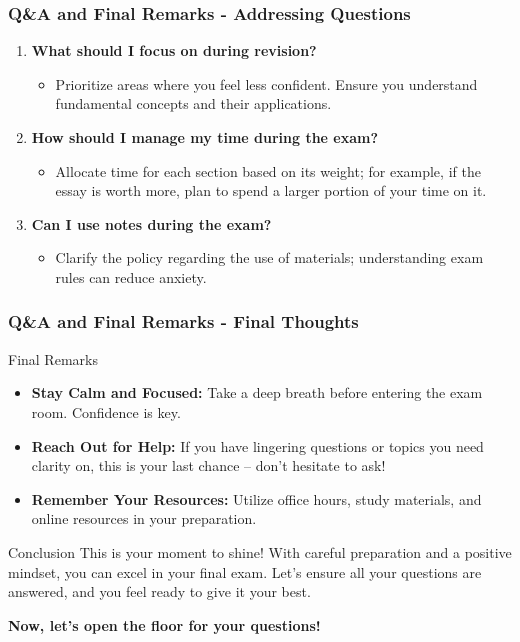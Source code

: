 \documentclass{beamer}
\begin{document}
\begin{frame}[fragile]
    \frametitle{Q\&A and Final Remarks - Addressing Questions}
    \begin{enumerate}
        \item \textbf{What should I focus on during revision?}
        \begin{itemize}
            \item Prioritize areas where you feel less confident. Ensure you understand fundamental concepts and their applications.
        \end{itemize}
        
        \item \textbf{How should I manage my time during the exam?}
        \begin{itemize}
            \item Allocate time for each section based on its weight; for example, if the essay is worth more, plan to spend a larger portion of your time on it.
        \end{itemize}
        
        \item \textbf{Can I use notes during the exam?}
        \begin{itemize}
            \item Clarify the policy regarding the use of materials; understanding exam rules can reduce anxiety.
        \end{itemize}
    \end{enumerate}
\end{frame}

\begin{frame}[fragile]
    \frametitle{Q\&A and Final Remarks - Final Thoughts}
    \begin{block}{Final Remarks}
        \begin{itemize}
            \item \textbf{Stay Calm and Focused:} Take a deep breath before entering the exam room. Confidence is key.
            \item \textbf{Reach Out for Help:} If you have lingering questions or topics you need clarity on, this is your last chance – don’t hesitate to ask!
            \item \textbf{Remember Your Resources:} Utilize office hours, study materials, and online resources in your preparation.
        \end{itemize}
    \end{block}

    \begin{block}{Conclusion}
        This is your moment to shine! With careful preparation and a positive mindset, you can excel in your final exam. Let’s ensure all your questions are answered, and you feel ready to give it your best.
    \end{block}
    
    \textbf{Now, let’s open the floor for your questions!}
\end{frame}
\end{document}
